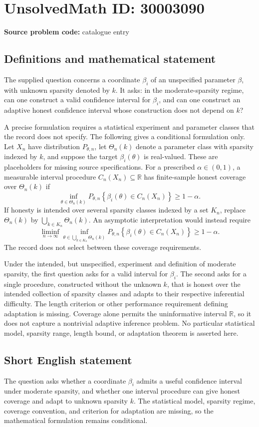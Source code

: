 \documentclass[11pt]{article}
\newcommand{\R}{\mathbb{R}}
\begin{document}
\section*{UnsolvedMath ID: 30003090}
\textbf{Source problem code:} catalogue entry
\subsection{Definitions and mathematical statement}
The supplied question concerns a coordinate \(\beta_i\) of an unspecified parameter \(\beta\), with unknown sparsity denoted by \(k\). It asks: in the moderate-sparsity regime, can one construct a valid confidence interval for \(\beta_i\), and can one construct an adaptive honest confidence interval whose construction does not depend on \(k\)?

A precise formulation requires a statistical experiment and parameter classes that the record does not specify. The following gives a conditional formulation only. Let \(X_n\) have distribution \(P_{\theta,n}\), let \(\Theta_n(k)\) denote a parameter class with sparsity indexed by \(k\), and suppose the target \(\beta_i(\theta)\) is real-valued. These are placeholders for missing source specifications. For a prescribed \(\alpha\in(0,1)\), a measurable interval procedure \(C_n(X_n)\subseteq\R\) has finite-sample honest coverage over \(\Theta_n(k)\) if
\[
\inf_{\theta\in\Theta_n(k)}P_{\theta,n}\!\left\{\beta_i(\theta)\in C_n(X_n)\right\}\geq 1-\alpha.
\]
If honesty is intended over several sparsity classes indexed by a set \(K_n\), replace \(\Theta_n(k)\) by \(\bigcup_{k\in K_n}\Theta_n(k)\). An asymptotic interpretation would instead require
\[
\liminf_{n\to\infty}\inf_{\theta\in\bigcup_{k\in K_n}\Theta_n(k)}P_{\theta,n}\!\left\{\beta_i(\theta)\in C_n(X_n)\right\}\geq 1-\alpha.
\]
The record does not select between these coverage requirements.

Under the intended, but unspecified, experiment and definition of moderate sparsity, the first question asks for a valid interval for \(\beta_i\). The second asks for a single procedure, constructed without the unknown \(k\), that is honest over the intended collection of sparsity classes and adapts to their respective inferential difficulty. The length criterion or other performance requirement defining adaptation is missing. Coverage alone permits the uninformative interval \(\R\), so it does not capture a nontrivial adaptive inference problem. No particular statistical model, sparsity range, length bound, or adaptation theorem is asserted here.
\subsection{Short English statement}
The question asks whether a coordinate \(\beta_i\) admits a useful confidence interval under moderate sparsity, and whether one interval procedure can give honest coverage and adapt to unknown sparsity \(k\). The statistical model, sparsity regime, coverage convention, and criterion for adaptation are missing, so the mathematical formulation remains conditional.
\end{document}
